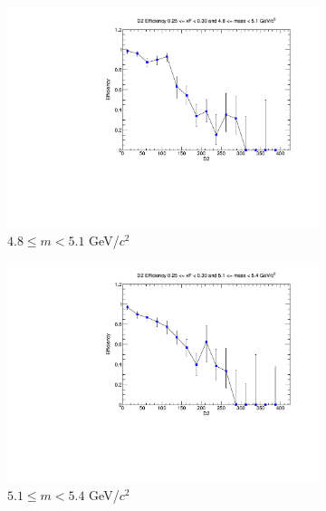 \begin{figure}[p]
\begin{subfigure}[b]{0.32\textwidth}
        \centering
        \includegraphics[width=\textwidth]{./kTrackerEfficiencyPlots/D2_Efficiency_xF5_mass2.pdf}
        \caption{$4.8 \leq m < 5.1$ GeV/$c^2$}
        \label{fig:xF5_mass2}
    \end{subfigure}
    \vspace{0.5cm}
    \begin{subfigure}[b]{0.32\textwidth}
        \centering
        \includegraphics[width=\textwidth]{./kTrackerEfficiencyPlots/D2_Efficiency_xF5_mass3.pdf}
        \caption{$5.1 \leq m < 5.4$ GeV/$c^2$}
        \label{fig:xF5_mass3}
    \end{subfigure}
    \hfill
    \begin{subfigure}[b]{0.32\textwidth}
        \centering

\end{subfigure}
\end{figure}
